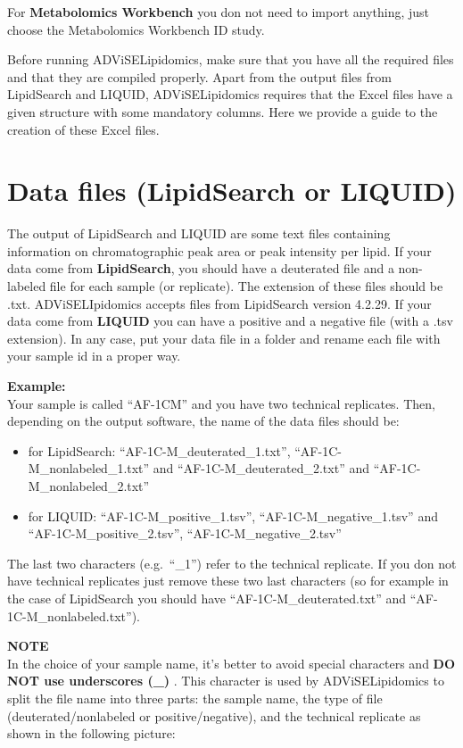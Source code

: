 \documentclass[
]{book}
\providecommand{\tightlist}{%
  \setlength{\itemsep}{0pt}\setlength{\parskip}{0pt}}
\begin{document}
For \textbf{Metabolomics Workbench} you don not need to import anything, just choose the Metabolomics Workbench ID study.

Before running ADViSELipidomics, make sure that you have all the required files and that they are compiled properly. Apart from the output files from LipidSearch and LIQUID, ADViSELipidomics requires that the Excel files have a given structure with some mandatory columns. Here we provide a guide to the creation of these Excel files.

\hypertarget{sec21}{%
\section{Data files (LipidSearch or LIQUID)}\label{sec21}}

The output of LipidSearch and LIQUID are some text files containing information on chromatographic peak area or peak intensity per lipid. If your data come from \textbf{LipidSearch}, you should have a deuterated file and a non-labeled file for each sample (or replicate). The extension of these files should be .txt. ADViSELIpidomics accepts files from LipidSearch version 4.2.29. If your data come from \textbf{LIQUID} you can have a positive and a negative file (with a .tsv extension). In any case, put your data file in a folder and rename each file with your sample id in a proper way.

\textbf{Example:}\\
Your sample is called ``AF-1CM'' and you have two technical replicates. Then, depending on the output software, the name of the data files should be:

\begin{itemize}
\tightlist
\item
  for LipidSearch: ``AF-1C-M\_deuterated\_1.txt'', ``AF-1C-M\_nonlabeled\_1.txt'' and ``AF-1C-M\_deuterated\_2.txt'' and ``AF-1C-M\_nonlabeled\_2.txt''
\item
  for LIQUID: ``AF-1C-M\_positive\_1.tsv'', ``AF-1C-M\_negative\_1.tsv'' and ``AF-1C-M\_positive\_2.tsv'', ``AF-1C-M\_negative\_2.tsv''
\end{itemize}

The last two characters (e.g.~``\_1'') refer to the technical replicate. If you don not have technical replicates just remove these two last characters (so for example in the case of LipidSearch you should have ``AF-1C-M\_deuterated.txt'' and ``AF-1C-M\_nonlabeled.txt'').

\textbf{NOTE}\\
In the choice of your sample name, it's better to avoid special characters and \textbf{DO NOT use underscores (\_)} . This character is used by ADViSELipidomics to split the file name into three parts: the sample name, the type of file (deuterated/nonlabeled or positive/negative), and the technical replicate as shown in the following picture:
\end{document}
